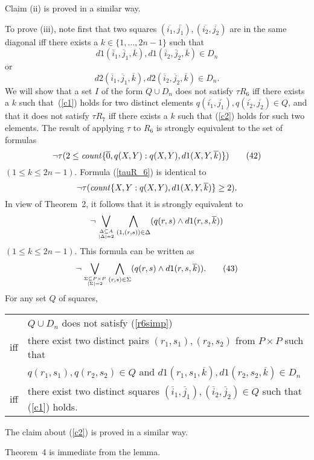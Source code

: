 \documentclass{tlp}
\def\o{\overline}
\def\beq{\begin{equation}}
\def\eeq#1{\label{#1}\end{equation}}
\def\i#1{\hbox{\it #1\/}}
\begin{document}
\begin{proof*}
Claim (ii) is proved in a similar way.

To prove (iii), note first that two squares
$(\o{i_1}, \o{j_1}), (\o{i_2}, \o{j_2})$ are in the same diagonal iff
there exists a $k \in \{1, \dots, 2n-1\}$ such that
\[
d1(\o i_1, \o j_1, \o k), d1(\o i_2, \o j_2, \o k) \in D_n
\tag{40}
\label{c1}
\]
or
\[
d2(\o i_1, \o j_1, \o k), d2(\o i_2, \o j_2, \o k) \in D_n.
\tag{41}
\label{c2}
\]
We will show that a set $I$ of the form $Q \cup D_n$ does not satisfy
$\tau R_6$ iff
there exists a $k$ such that~(\ref{c1}) holds for two distinct elements
$q(\o{i_1}, \o{j_1}), q(\o{i_2}, \o{j_2}) \in Q$, and that it does not
satisfy
$\tau R_7$ iff there exists a $k$ such that (\ref{c2}) holds for such two
elements.  The result of applying $\tau$ to $R_6$ is strongly
equivalent to the set of formulas
\[
  \neg \tau(2 \leq \i{count}\{\o 0, q(X,Y) : q(X,Y), d1(X,Y,\o k)\})
\tag{42}
\label{tauR_6}
\]
$(1 \leq k \leq 2n-1)$. Formula (\ref{tauR_6}) is identical to
$$
\neg \tau ( \i{count}\{X,Y : q(X,Y), d1(X,Y,\o k)\} \geq 2 ).
$$
In view of Theorem~2, it follows that it is strongly equivalent
to
$$
\neg \bigvee_{\Delta \subseteq A \atop \lvert \Delta
 \rvert = 2} \bigwedge_{(1, (r,s)) \in \Delta} (q(r, s) \land d1(r, s,  \o k))
$$
$(1 \leq k \leq 2n-1)$. This formula can be written as
\[
 \neg \bigvee_{\Sigma \subseteq P \times P \atop \lvert \Sigma
 \rvert = 2} \bigwedge_{(r,s) \in \Sigma} (q(r, s) \land d1(r, s,  \o k)).
\tag{43}
\label{r6simp}\]
For any set $Q$ of squares,
\begin{center}
\begin{tabular}{l  l}
    & $Q \cup D_n$ does not satisfy (\ref{r6simp}) \\
iff & there exist two distinct pairs $(r_1, s_1), (r_2, s_2)$ from
    $P \times P$ such that\\
    & $q(r_1,s_1),q(r_2, s_2) \in Q$ and $d1(r_1,s_1,\o k),
    d1(r_2, s_2, \o k) \in D_n$\\
iff & there exist two distinct squares $(\o i_1, \o j_1), (\o i_2, \o j_2) \in
    Q$ such that (\ref{c1}) holds.
\end{tabular}
\end{center}

The claim about (\ref{c2}) is proved in a similar way.
\end{proof*}

Theorem~4 is immediate from the lemma.

% 
% 
\end{document}
